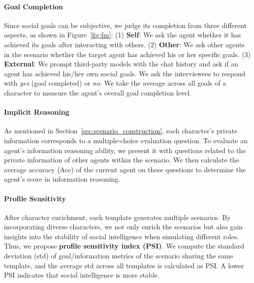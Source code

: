 \paragraph{Goal Completion}
Since social goals can be subjective, we judge its completion from three different aspects, as shown in Figure~\ref{fig:fm}:
(1) \textbf{Self}: We ask the agent whether it has achieved its goals after interacting with others.
(2) \textbf{Other}: We ask other agents in the scenario whether the target agent has achieved his or her specific goals.
(3) \textbf{External}: We prompt third-party models with the chat history and ask if an agent has achieved his/her own social goals.
We ask the interviewees to respond with \textit{yes} (goal completed) or \textit{no}.
We take the average across all goals of a character to measure the agent's overall goal completion level.

\paragraph{Implicit Reasoning}
As mentioned in Section~\ref{sec:scenario_construction}, each character's private information corresponds to a multiple-choice evaluation question.
To evaluate an agent's information reasoning ability, we present it with questions related to the private information of other agents within the scenario.
We then calculate the average accuracy (Acc) of the current agent on these questions to determine the agent's score in information reasoning.

\paragraph{Profile Sensitivity} 
After character enrichment, each template generates multiple scenarios. By incorporating diverse characters, we not only enrich the scenarios but also gain insights into the stability of social intelligence when simulating different roles.
Thus, we propose \textbf{profile sensitivity index (PSI)}. We compute the standard deviation (std) of goal/information metrics of the scenario sharing the same template, and the average std across all templates is calculated as PSI.
A lower PSI indicates that social intelligence is more stable.